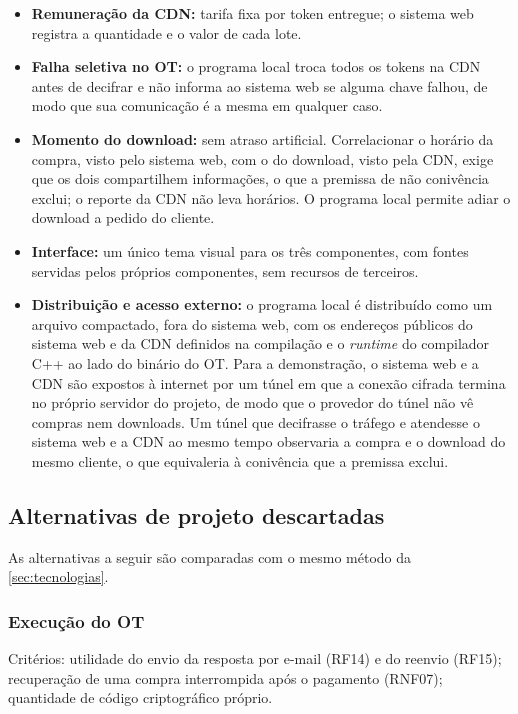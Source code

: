 \begin{itemize}
\item \textbf{Remuneração da CDN:} tarifa fixa por token entregue; o sistema
web registra a quantidade e o valor de cada lote.

\item \textbf{Falha seletiva no OT:} o programa local troca todos os tokens na
CDN antes de decifrar e não informa ao sistema web se alguma chave falhou, de
modo que sua comunicação é a mesma em qualquer caso.

\item \textbf{Momento do download:} sem atraso artificial. Correlacionar o
horário da compra, visto pelo sistema web, com o do download, visto pela CDN,
exige que os dois compartilhem informações, o que a premissa de não conivência
exclui; o reporte da CDN não leva horários. O programa local permite adiar o
download a pedido do cliente.

\item \textbf{Interface:} um único tema visual para os três componentes, com
fontes servidas pelos próprios componentes, sem recursos de terceiros.

\item \textbf{Distribuição e acesso externo:} o programa local é distribuído
como um arquivo compactado, fora do sistema web, com os endereços públicos do
sistema web e da CDN definidos na compilação e o \emph{runtime} do compilador
C++ ao lado do binário do OT. Para a demonstração, o sistema web e a CDN são
expostos à internet por um túnel em que a conexão cifrada termina no próprio
servidor do projeto, de modo que o provedor do túnel não vê compras nem
downloads. Um túnel que decifrasse o tráfego e atendesse o sistema web e a CDN
ao mesmo tempo observaria a compra e o download do mesmo cliente, o que
equivaleria à conivência que a premissa exclui.
\end{itemize}


\subsection{Alternativas de projeto descartadas}\label{sec:alternativas}

As alternativas a seguir são comparadas com o mesmo método da
\autoref{sec:tecnologias}.

\subsubsection{Execução do OT}

Critérios: utilidade do envio da resposta por e-mail (RF14) e do reenvio
(RF15); recuperação de uma compra interrompida após o pagamento (RNF07);
quantidade de código criptográfico próprio.

